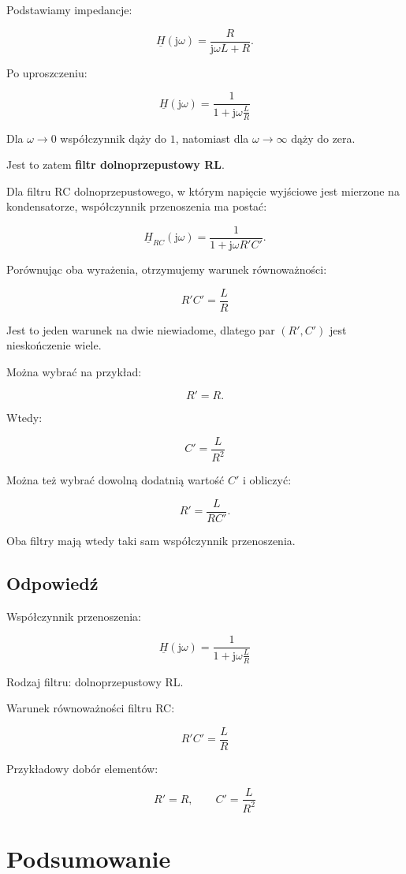 \documentclass[12pt,a4paper]{article}
\newcommand{\jw}{\mathrm{j}\omega}
\newcommand{\Htr}{\underline{H}}
\begin{document}
Podstawiamy impedancje:

\[
\Htr(\jw)=
\frac{R}{\jw L+R}.
\]

Po uproszczeniu:

\[
\boxed{
\Htr(\jw)=
\frac{1}{1+\jw\frac{L}{R}}
}
\]

Dla $\omega\to0$ współczynnik dąży do $1$,
natomiast dla $\omega\to\infty$ dąży do zera.

Jest to zatem \textbf{filtr dolnoprzepustowy RL}.

Dla filtru RC dolnoprzepustowego, w którym napięcie wyjściowe
jest mierzone na kondensatorze, współczynnik przenoszenia ma postać:

\[
\Htr_{RC}(\jw)=
\frac{1}{1+\jw R'C'}.
\]

Porównując oba wyrażenia, otrzymujemy warunek równoważności:

\[
\boxed{R'C'=\frac{L}{R}}
\]

Jest to jeden warunek na dwie niewiadome,
dlatego par $(R',C')$ jest nieskończenie wiele.

Można wybrać na przykład:

\[
R'=R.
\]

Wtedy:

\[
\boxed{C'=\frac{L}{R^2}}
\]

Można też wybrać dowolną dodatnią wartość $C'$
i obliczyć:

\[
R'=\frac{L}{RC'}.
\]

Oba filtry mają wtedy taki sam współczynnik przenoszenia.

\subsection*{Odpowiedź}

Współczynnik przenoszenia:

\[
\boxed{
\Htr(\jw)=
\frac{1}{1+\jw\frac{L}{R}}
}
\]

Rodzaj filtru: dolnoprzepustowy RL.

Warunek równoważności filtru RC:

\[
\boxed{R'C'=\frac{L}{R}}
\]

Przykładowy dobór elementów:

\[
\boxed{R'=R,\qquad C'=\frac{L}{R^2}}
\]

\section*{Podsumowanie}
\end{document}
